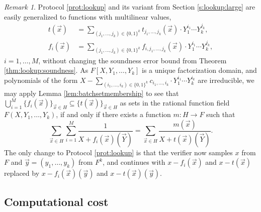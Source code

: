 \documentclass[11pt]{article}
\theoremstyle{definition}
\theoremstyle{remark}
\newtheorem{rem}[thm]{Remark}
\begin{document}
\begin{rem}
\label{s:pa:Generalizations}
Protocol \ref{prot:lookup} and its variant from Section \ref{s:lookup:large} are easily generalized to functions with multilinear values, 
\begin{align*}
t(\vec x) &= \sum_{(j_1,\ldots, j_k)\in\{0,1\}^k} t_{j_1,\ldots, j_k}(\vec x)\cdot Y_1^{i_1}\cdots Y_k^{j_k},
\\
f_i(\vec x) &= \sum_{(j_1,\ldots, j_k)\in\{0,1\}^k} f_{i, j_1,\ldots, j_k}(\vec x)\cdot Y_1^{i_1}\cdots Y_k^{j_k},
\end{align*}
$i=1,\ldots, M$, without changing the soundness error bound from Theorem \ref{thm:lookup:soundness}.
As $F[X, Y_1,\ldots, Y_k]$ is a unique factorization domain, and polynomials of the form $X -  \sum_{(i_1,\ldots, i_k)\in\{0,1\}^k} c_{i_1,\ldots, i_k}\cdot Y_1^{i_1}\cdots Y_k^{i_k}$ are irreducible, we may apply Lemma \ref{lem:batchsetmembership} to see that $\bigcup_{i=1}^M \{f_i(\vec x)\}_{\vec x\in H}\subseteq \{t(\vec x)\}_{\vec x\in H}$ as sets in the rational function field $F(X, Y_1,\ldots, Y_k)$, if and only if there exists a function $m: H\rightarrow F$ such that
\begin{equation}
\label{e:lookup:fractional:identity:general}
\sum_{\vec x\in H} \sum_{i=1}^M \frac{1}{X + f_i(\vec x)(\vec Y)} = \sum_{\vec x\in H} \frac{m(\vec x)}{X + t(\vec x)(\vec Y)}.
\end{equation}
The only change to Protocol \ref{prot:lookup} is that the verifier now samples $x$ from $F$ and $\vec y = (y_1,\ldots, y_k)$ from $F^k$, and continues with $x - f_i(\vec x)$ and $x - t(\vec x)$ replaced by $x - f_i(\vec x)(\vec y)$ and $x - t(\vec x)(\vec y)$.
\end{rem}

\subsection{Computational cost}
\label{s:lookup:cost}
\end{document}
